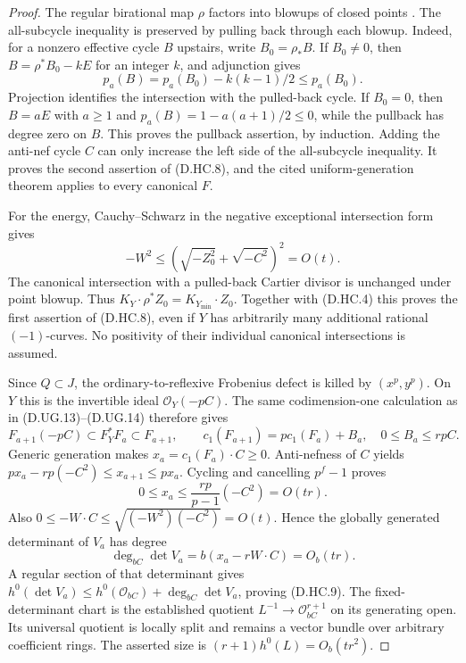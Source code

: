 \begin{proof}
The regular birational map $\rho$ factors into blowups of closed
points \citep[Lemma~54.17.1, Tag~0C5R]{StacksHereditaryCartierD}.
The all-subcycle inequality is preserved by pulling back through
each blowup. Indeed, for a nonzero effective cycle $B$ upstairs,
write $B_0=\rho_*B$. If $B_0\ne0$, then
$B=\rho^*B_0-kE$ for an integer $k$, and adjunction gives
\[
                  p_a(B)=p_a(B_0)-k(k-1)/2\le p_a(B_0).
                                                        \tag{D.HC.10}
\]
Projection identifies the intersection with the pulled-back
cycle. If $B_0=0$, then $B=aE$ with $a\ge1$ and
$p_a(B)=1-a(a+1)/2\le0$, while the pullback has degree zero
on $B$. This proves the pullback assertion, by induction.
Adding the anti-nef cycle $C$ can only increase the left side
of the all-subcycle inequality. It proves the second assertion
of (D.HC.8), and the cited uniform-generation theorem applies
to every canonical $F$.

For the energy, Cauchy--Schwarz in the negative exceptional
intersection form gives
\[
 -W^2\le\left(\sqrt{-Z_0^2}+\sqrt{-C^2}\right)^2=O(t).
\]
The canonical intersection with a pulled-back Cartier divisor
is unchanged under point blowup. Thus
$K_Y\cdot\rho^*Z_0=K_{Y_{\min}}\cdot Z_0$.
Together with (D.HC.4) this proves the first assertion of
(D.HC.8), even if $Y$ has arbitrarily many additional rational
$(-1)$-curves. No positivity of their individual canonical
intersections is assumed.

Since $Q\subset J$, the ordinary-to-reflexive Frobenius defect
is killed by $(x^p,y^p)$. On $Y$ this is the invertible ideal
$\mathcal O_Y(-pC)$. The same codimension-one calculation as in
(D.UG.13)--(D.UG.14) therefore gives
\[
 F_{a+1}(-pC)\subset F_Y^*F_a\subset F_{a+1},\qquad
 c_1(F_{a+1})=p c_1(F_a)+B_a,
                         \quad0\le B_a\le rpC.         \tag{D.HC.11}
\]
Generic generation makes $x_a=c_1(F_a)\cdot C\ge0$.
Anti-nefness of $C$ yields
$p x_a-rp(-C^2)\le x_{a+1}\le p x_a$.
Cycling and cancelling $p^f-1$ proves
\[
                  0\le x_a\le\frac{rp}{p-1}(-C^2)=O(tr).
                                                        \tag{D.HC.12}
\]
Also $0\le-W\cdot C\le\sqrt{(-W^2)(-C^2)}=O(t)$.
Hence the globally generated determinant of $V_a$ has degree
\[
              \deg_{bC}\det V_a=b(x_a-rW\cdot C)=O_b(tr).
\]
A regular section of that determinant gives
$h^0(\det V_a)\le h^0(\mathcal O_{bC})+
\deg_{bC}\det V_a$, proving (D.HC.9).
The fixed-determinant chart is the established quotient
$L^{-1}\to\mathcal O_{bC}^{r+1}$ on its generating open.
Its universal quotient is locally split and remains a vector
bundle over arbitrary coefficient rings. The asserted size is
$(r+1)h^0(L)=O_b(tr^2)$.
\end{proof}
